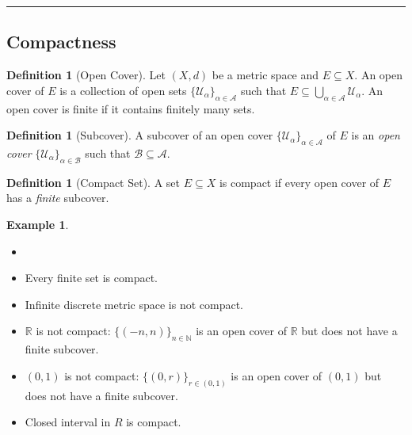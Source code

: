 \documentclass[12pt, lettersize]{book}
\theoremstyle{plain}
\theoremstyle{definition}
\newtheorem{dfn}[thm]{Definition}
\newtheorem*{eg}{Example}
\theoremstyle{remark}
\newcommand{\R}{\mathbb{R}}
\newcommand{\N}{\mathbb{N}}
\begin{document}
		\noindent\rule{\textwidth}{1pt}
		\subsection*{Compactness}
		
		\begin{dfn}[Open Cover]
		Let $(X,d)$ be a metric space and $E\subseteq X$. An open cover of $E$ is a collection of open sets $\{\mathcal{U}_\alpha\}_{\alpha\in\mathcal{A}}$ such that $E\subseteq\bigcup_{\alpha\in\mathcal{A}}\mathcal{U}_\alpha$. An open cover is finite if it contains finitely many sets.
		\end{dfn}
		
		\begin{dfn}[Subcover]
		A subcover of an open cover $\{\mathcal{U}_\alpha\}_{\alpha\in\mathcal{A}}$ of $E$ is an \emph{open cover} $\{\mathcal{U}_\alpha\}_{\alpha\in\mathcal{B}}$ such that $\mathcal{B}\subseteq\mathcal{A}$.
		\end{dfn}
	
		\begin{dfn}[Compact Set]
		A set $E\subseteq X$ is compact if every open cover of $E$ has a \emph{finite} subcover.
		\end{dfn}
		\begin{eg}
		\begin{itemize}
			\item[]
			\item Every finite set is compact.
			\item Infinite discrete metric space is not compact.
			\item $\R$ is not compact: $\{(-n,n)\}_{n\in\N}$ is an open cover of $\R$ but does not have a finite subcover.
			\item $(0,1)$ is not compact: $\{(0,r)\}_{r\in(0,1)} $ is an open cover of $(0,1)$ but does not have a finite subcover.
			\item Closed interval in $R$ is compact.
		\end{itemize}
		\end{eg}
		
\end{document}
